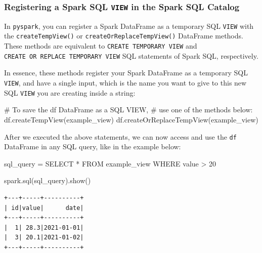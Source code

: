 \documentclass[
  11pt,
  letterpaper,
  DIV=11,
  numbers=noendperiod]{scrreprt}
\newenvironment{Shaded}{\begin{snugshade}}{\end{snugshade}}
\newcommand{\CommentTok}[1]{\textcolor[rgb]{0.37,0.37,0.37}{#1}}
\newcommand{\NormalTok}[1]{\textcolor[rgb]{0.00,0.23,0.31}{#1}}
\newcommand{\OperatorTok}[1]{\textcolor[rgb]{0.37,0.37,0.37}{#1}}
\newcommand{\StringTok}[1]{\textcolor[rgb]{0.13,0.47,0.30}{#1}}
\begin{document}
\subsubsection{\texorpdfstring{Registering a Spark SQL \texttt{VIEW} in
the Spark SQL
Catalog}{Registering a Spark SQL VIEW in the Spark SQL Catalog}}\label{registering-a-spark-sql-view-in-the-spark-sql-catalog}

In \texttt{pyspark}, you can register a Spark DataFrame as a temporary
SQL \texttt{VIEW} with the \texttt{createTempView()} or
\texttt{createOrReplaceTempView()} DataFrame methods. These methods are
equivalent to \texttt{CREATE\ TEMPORARY\ VIEW} and
\texttt{CREATE\ OR\ REPLACE\ TEMPORARY\ VIEW} SQL statements of Spark
SQL, respectively.

In essence, these methods register your Spark DataFrame as a temporary
SQL \texttt{VIEW}, and have a single input, which is the name you want
to give to this new SQL \texttt{VIEW} you are creating inside a string:

\begin{Shaded}
\begin{Highlighting}[]
\CommentTok{\# To save the \textasciigrave{}df\textasciigrave{} DataFrame as a SQL VIEW,}
\CommentTok{\# use one of the methods below:}
\NormalTok{df.createTempView(}\StringTok{\textquotesingle{}example\_view\textquotesingle{}}\NormalTok{)}
\NormalTok{df.createOrReplaceTempView(}\StringTok{\textquotesingle{}example\_view\textquotesingle{}}\NormalTok{)}
\end{Highlighting}
\end{Shaded}

After we executed the above statements, we can now access and use the
\texttt{df} DataFrame in any SQL query, like in the example below:

\begin{Shaded}
\begin{Highlighting}[]
\NormalTok{sql\_query }\OperatorTok{=} \StringTok{\textquotesingle{}\textquotesingle{}\textquotesingle{}}
\StringTok{SELECT *}
\StringTok{FROM example\_view}
\StringTok{WHERE value \textgreater{} 20}
\StringTok{\textquotesingle{}\textquotesingle{}\textquotesingle{}}

\NormalTok{spark.sql(sql\_query).show()}
\end{Highlighting}
\end{Shaded}

\begin{verbatim}
+---+-----+----------+
| id|value|      date|
+---+-----+----------+
|  1| 28.3|2021-01-01|
|  3| 20.1|2021-01-02|
+---+-----+----------+
\end{verbatim}
\end{document}
